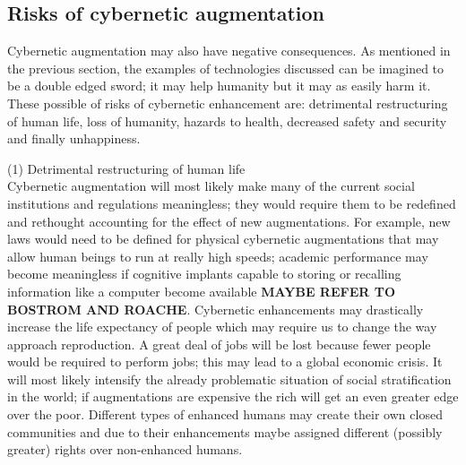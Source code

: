 \subsection{Risks of cybernetic augmentation}


Cybernetic augmentation may also have negative consequences. As mentioned in the previous section, the examples of technologies discussed can be imagined to be a double edged sword; it may help humanity but it may as easily harm it. These possible of risks of cybernetic enhancement are: detrimental restructuring of human life, loss of humanity, hazards to health, decreased safety and security and finally unhappiness.

(1) Detrimental restructuring of human life \\

Cybernetic augmentation will most likely make many of the current social institutions and regulations meaningless; they would require them to be redefined and rethought accounting for the effect of new augmentations. For example, new laws would need to be defined for physical cybernetic augmentations that may allow human beings to run at really high speeds; academic performance may become meaningless if cognitive implants capable to storing or recalling information like a computer become available {\bf MAYBE REFER TO BOSTROM AND ROACHE}. Cybernetic enhancements may drastically increase the life expectancy of people which may require us to change the way approach reproduction. A great deal of jobs will be lost because fewer people would be required to perform jobs; this may lead to a global economic crisis. It will most likely intensify the already problematic situation of social stratification in the world; if augmentations are expensive the rich will get an even greater edge over the poor. Different types of enhanced humans may create their own closed communities and due to their enhancements maybe assigned different (possibly greater) rights over non-enhanced humans.


